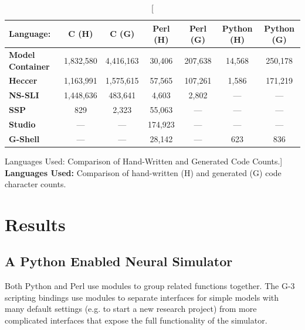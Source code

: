\documentclass[12pt]{article}
\begin{document}
\begin{table}[h]
  \centering
  \begin{tabular}{|l|c|c|c|c|c|c|}
    \hline

    \rule[-2ex]{0mm}{5ex}
    {\bf Language:}
    & {\bf C (H)}
    & {\bf C (G)}
    & {\bf Perl (H)}
    & {\bf Perl (G)}
    & {\bf Python (H)}
    & {\bf Python (G)} \\

    \hline

    \rule[-2ex]{0mm}{5ex}
    {\bf Model\,Container}
    & 1,832,580
    & 4,416,163
    & 30,406
    & 207,638
    & 14,568
    & 250,178 \\

    \rule[-2ex]{0mm}{5ex}
    {\bf Heccer}
    & 1,163,991
    & 1,575,615
    & 57,565
    & 107,261
    & 1,586
    & 171,219 \\

    \rule[-2ex]{0mm}{5ex}
    {\bf NS-SLI}
    & 1,448,636
    & 483,641
    & 4,603
    & 2,802
    & ---
    & --- \\

    \rule[-2ex]{0mm}{5ex}
    {\bf SSP}
    & 829
    & 2,323
    & 55,063
    & ---
    & ---
    & --- \\

    \rule[-2ex]{0mm}{5ex}
    {\bf Studio}
    & ---
    & ---
    & 174,923
    & ---
    & ---
    & --- \\

    \rule[-2ex]{0mm}{5ex}
    {\bf G-Shell}
    & ---
    & ---
    & 28,142
    & ---
    & 623
    & 836 \\

    \hline
  \end{tabular}
  \caption
  [Languages Used: Comparison of Hand-Written and Generated Code Counts.]
  {
    {\bf Languages Used:} Comparison of hand-written (H) and generated (G)  code character counts.
  }
  \label{tab:cbi-codecounts}
\end{table}


\section{Results}

\subsection{A Python Enabled Neural Simulator}
\label{ss-apens}

Both Python  and Perl use modules to group related functions together.
The G-3 scripting bindings use modules to separate interfaces for
simple models with many default settings (e.g. to start a new research
project) from more complicated interfaces that expose the full
functionality of the simulator.
\end{document}
